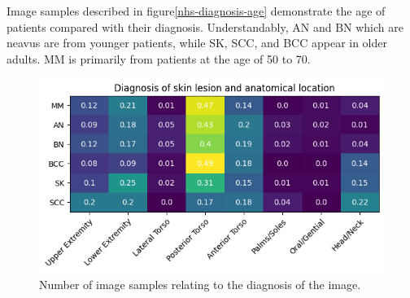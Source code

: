 Image samples described in figure\ref{nhs-diagnosis-age} demonstrate the age of patients compared with their diagnosis. Understandably, AN and BN which are neavus are from younger patients, while SK, SCC, and BCC appear in older adults. MM is primarily from patients at the age of 50 to 70.

\begin{figure}
    \centering
    \includegraphics[scale=0.75]{images/nhs/nhs-location-diagnosis.png}
    \caption{Number of image samples relating to the diagnosis of the image.} 
\end{figure}\label{nhs-location-diagnosis}

